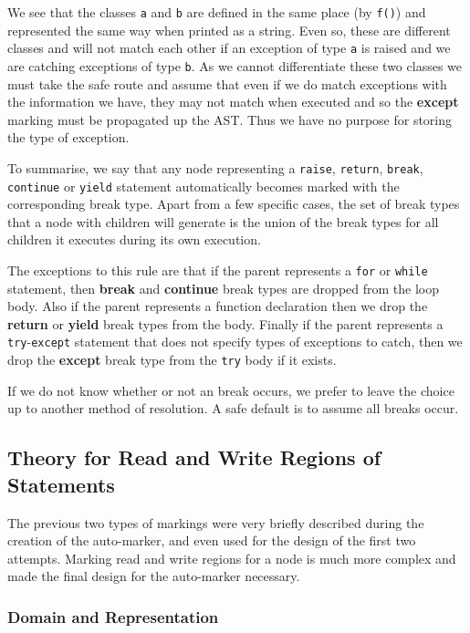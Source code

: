 \documentclass[twoside,a4paper]{report}
\begin{document}


We see that the classes \texttt{a} and \texttt{b} are defined in the same place (by \texttt{f()}) and represented the same way when printed as a string. Even
so, these are different classes and will not match each other if an exception of type \texttt{a} is raised and we are catching exceptions of type \texttt{b}.
As we cannot differentiate these two classes we must take the safe route and assume that even if we do match exceptions with the information we have, they may
not match when executed and so the \textbf{except} marking must be propagated up the AST. Thus we have no purpose for storing the type of exception.

To summarise, we say that any node representing a \texttt{raise}, \texttt{return}, \texttt{break}, \texttt{continue} or \texttt{yield} statement automatically
becomes marked with the corresponding break type. Apart from a few specific cases, the set of break types that a node with children will generate is the union
of the break types for all children it executes during its own execution.

The exceptions to this rule are that if the parent represents a \texttt{for} or \texttt{while} statement, then \textbf{break} and \textbf{continue} break types
are dropped from the loop body. Also if the parent represents a function declaration then we drop the \textbf{return} or \textbf{yield} break types from the
body. Finally if the parent represents a \texttt{try}-\texttt{except} statement that does not specify types of exceptions to catch, then we drop the
\textbf{except} break type from the \texttt{try} body if it exists.

If we do not know whether or not an break occurs, we prefer to leave the choice up to another method of resolution. A safe default is to assume all breaks occur.

\subsection{Theory for Read and Write Regions of Statements}

The previous two types of markings were very briefly described during the creation of the auto-marker, and even used for the design of the first two attempts.
Marking read and write regions for a node is much more complex and made the final design for the auto-marker necessary.

\subsubsection{Domain and Representation}
\end{document}
